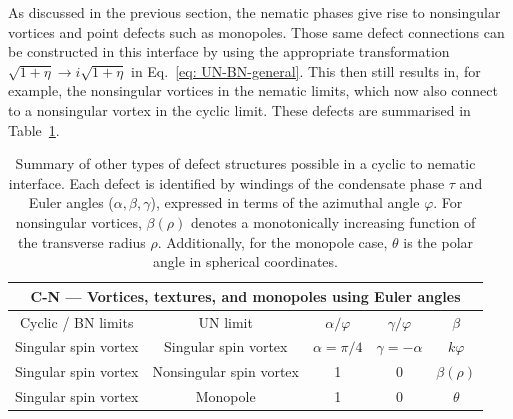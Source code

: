 As discussed in the previous section, the nematic phases give rise to
nonsingular vortices and point defects such as monopoles.
Those same defect connections can be constructed in this interface by using
the appropriate transformation \(\sqrt{1+\eta} \rightarrow i\sqrt{1+\eta}\) in
Eq.~\eqref{eq: UN-BN-general}.
This then still results in, for example, the nonsingular vortices in the
nematic limits, which now also connect to a nonsingular vortex in the cyclic
limit.
These defects are summarised in Table~\ref{tab: C-N-other}.
\begin{table}
    \centering
    \begin{tabular}{ccccc}
        \toprule
        \multicolumn{5}{c}{C-N --- Vortices, textures, and monopoles using Euler
            angles} \\
        \midrule
        Cyclic / BN limits & UN limit & \(\alpha/\varphi \)
        & \(\gamma/\varphi \) & \(\beta \) \\
        \midrule
        Singular spin vortex & Singular spin vortex & \(\alpha=\pi/4\)
            & \(\gamma=-\alpha\) & \(k\varphi\) \\
        Singular spin vortex & Nonsingular spin vortex & 1 & 0
            & \(\beta(\rho)\) \\
        Singular spin vortex & Monopole & 1 & 0 & \(\theta\) \\
        \bottomrule
    \end{tabular}
    \caption[Examples of monopole and nonsingular vortex connections across a
    cyclic to nematic interface]{\label{tab: C-N-other}Summary of other types of
    defect structures possible in a cyclic to nematic interface.
    Each defect is identified by windings of the condensate phase \(\tau \) and
    Euler angles (\(\alpha, \beta, \gamma \)), expressed in terms of the
    azimuthal angle \(\varphi \).
    For nonsingular vortices, \(\beta(\rho)\) denotes a monotonically increasing
    function of the transverse radius \(\rho \).
    Additionally, for the monopole case, \(\theta \) is the polar angle in
    spherical coordinates.}
\end{table}

